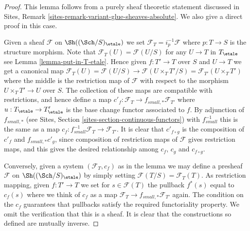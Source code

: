 \begin{proof}
This lemma follows from a purely sheaf theoretic statement discussed
in Sites, Remark \ref{sites-remark-variant-glue-sheaves-absolute}.
We also give a direct proof in this case.

\medskip\noindent
Given a sheaf $\mathcal{F}$ on $\Sh((\Sch/S)_\etale)$
we set $\mathcal{F}_T = i_p^{-1}\mathcal{F}$ where $p : T \to S$
is the structure morphism. Note that
$\mathcal{F}_T(U) = \mathcal{F}(U/S)$ for any $U \to T$
in $T_\etale$ see Lemma \ref{lemma-put-in-T-etale}.
Hence given $f : T' \to T$ over $S$ and $U \to T$ we get a canonical
map $\mathcal{F}_T(U) = \mathcal{F}(U/S) \to \mathcal{F}(U \times_T T'/S)
= \mathcal{F}_{T'}(U \times_T T')$ where the middle is the restriction map
of $\mathcal{F}$ with respect to the morphism
$U \times_T T' \to U$ over $S$. The collection of these maps are
compatible with restrictions, and hence define a map
$c'_f : \mathcal{F}_T \to f_{small, *}\mathcal{F}_{T'}$ where
$u : T_\etale \to T'_\etale$ is the base change functor
associated to $f$. By adjunction of $f_{small, *}$ (see
Sites, Section \ref{sites-section-continuous-functors}) with
$f_{small}^{-1}$ this is the same as a map
$c_f : f_{small}^{-1}\mathcal{F}_T \to \mathcal{F}_{T'}$.
It is clear that $c'_{f \circ g}$ is the composition of
$c'_f$ and $f_{small, *}c'_g$, since composition of restriction maps
of $\mathcal{F}$ gives restriction maps, and this gives the desired
relationship among $c_f$, $c_g$ and $c_{f \circ g}$.

\medskip\noindent
Conversely, given a system $(\mathcal{F}_T, c_f)$ as in the lemma
we may define a presheaf $\mathcal{F}$ on
$\Sh((\Sch/S)_\etale)$
by simply setting $\mathcal{F}(T/S) = \mathcal{F}_T(T)$. As restriction
mapping, given $f : T' \to T$ we set for $s \in \mathcal{F}(T)$
the pullback $f^*(s)$ equal to $c_f(s)$ where we think of $c_f$ as
a map $\mathcal{F}_T \to f_{small, *}\mathcal{F}_{T'}$ again.
The condition on the $c_f$ guarantees that
pullbacks satisfy the required functoriality property.
We omit the verification that this is a sheaf.
It is clear that the constructions so defined are mutually inverse.
\end{proof}























